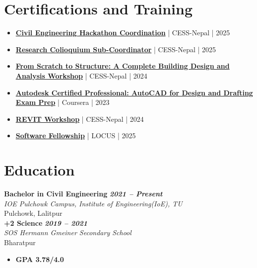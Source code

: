\documentclass[letterpaper,10pt]{article}
\newcommand{\educationentry}[4]{
  \vspace{3pt}
  \noindent\textbf{#1}
  \hfill
  \textbf{#4}
  \\
  \textit{#2}
  \\
  #3
  \vspace{2pt}
}
\begin{document}
\section*{Certifications and Training}
\begin{itemize}
    \item \href{https://drive.google.com/file/d/13FP420V4N3kIEH3vpe95hI6ZSyCQbWbq/view?usp=drive_link}{\textbf{Civil Engineering Hackathon Coordination}} | CESS-Nepal | 2025
    \item \href{https://drive.google.com/file/d/1hF1ZjcDjblOYg0p8WRuVM5oQv6S5h06k/view?usp=drive_link}{\textbf{Research Colioquium Sub-Coordinator}} | CESS-Nepal | 2025
    \item \href{https://drive.google.com/file/d/1vEiYuM20NYa5MXKmoSCZbO5wKgD9Xm-h/view?usp=drive_link}{\textbf{From Scratch to Structure: A Complete Building Design and Analysis Workshop}} | CESS-Nepal | 2024
    \item \href{https://drive.google.com/file/d/1LbZ5KcrILpWjn3JX_L3XufUkdAfEaXi4/view?usp=drive_link}{\textbf{Autodesk Certified Professional: AutoCAD for Design and Drafting Exam Prep}} | Coursera | 2023
    \item \href{https://drive.google.com/file/d/1MT2GzxbKQUI-PNYvOCNUv6Mh0RzW0R7F/view?usp=drive_link}{\textbf{REVIT Workshop}} | CESS-Nepal | 2024
    \item \href{https://drive.google.com/file/d/1KJXJMNAqku5jqxrENo2VmJ9n2NDD5k5n/view?usp=drive_link}{\textbf{Software Fellowship}} | LOCUS | 2025
\end{itemize}
\vspace{0.3cm}

\section*{Education}
\educationentry{Bachelor in Civil Engineering}{IOE Pulchowk Campus, Institute of Engineering(IoE), TU}{Pulchowk, Lalitpur}{\textit{2021 – Present}}\\
\educationentry{+2 Science}{SOS Hermann Gmeiner Secondary School}{Bharatpur}{\textit{2019 – 2021}}
\begin{itemize}
    \item \textbf{GPA 3.78/4.0}
\end{itemize}

\vspace{0.3cm}
\end{document}

